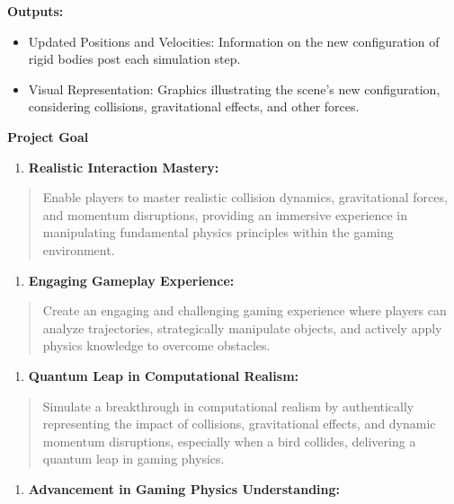 \documentclass[
]{article}
\begin{document}
\textbf{Outputs:}

\begin{itemize}
\item
  Updated Positions and Velocities: Information on the new configuration
  of rigid bodies post each simulation step.
\item
  Visual Representation: Graphics illustrating the scene's new
  configuration, considering collisions, gravitational effects, and
  other forces.
\end{itemize}

\textbf{Project Goal}

\begin{enumerate}
\def\labelenumi{\arabic{enumi}.}
\item
  \textbf{Realistic Interaction Mastery:}
\end{enumerate}

\begin{quote}
Enable players to master realistic collision dynamics, gravitational
forces, and momentum disruptions, providing an immersive experience in
manipulating fundamental physics principles within the gaming
environment.
\end{quote}

\begin{enumerate}
\def\labelenumi{\arabic{enumi}.}
\setcounter{enumi}{1}
\item
  \textbf{Engaging Gameplay Experience:}
\end{enumerate}

\begin{quote}
Create an engaging and challenging gaming experience where players can
analyze trajectories, strategically manipulate objects, and actively
apply physics knowledge to overcome obstacles.
\end{quote}

\begin{enumerate}
\def\labelenumi{\arabic{enumi}.}
\setcounter{enumi}{2}
\item
  \textbf{Quantum Leap in Computational Realism:}
\end{enumerate}

\begin{quote}
Simulate a breakthrough in computational realism by authentically
representing the impact of collisions, gravitational effects, and
dynamic momentum disruptions, especially when a bird collides,
delivering a quantum leap in gaming physics.
\end{quote}

\begin{enumerate}
\def\labelenumi{\arabic{enumi}.}
\setcounter{enumi}{3}
\item
  \textbf{Advancement in Gaming Physics Understanding:}
\end{enumerate}
\end{document}
